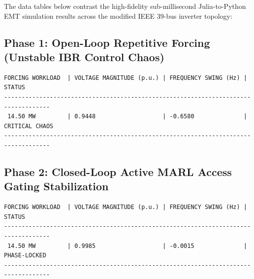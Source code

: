 \documentclass[11pt,fleqn]{article}
\begin{document}
The data tables below contrast the high-fidelity sub-millisecond Julia-to-Python EMT simulation results across the modified IEEE 39-bus inverter topology:

\subsection{Phase 1: Open-Loop Repetitive Forcing (Unstable IBR Control Chaos)}
\begin{verbatim}
FORCING WORKLOAD  | VOLTAGE MAGNITUDE (p.u.) | FREQUENCY SWING (Hz) | STATUS
-----------------------------------------------------------------------------------
 14.50 MW         | 0.9448                   | -0.6580              | CRITICAL CHAOS
-----------------------------------------------------------------------------------
\end{verbatim}

\subsection{Phase 2: Closed-Loop Active MARL Access Gating Stabilization}
\begin{verbatim}
FORCING WORKLOAD  | VOLTAGE MAGNITUDE (p.u.) | FREQUENCY SWING (Hz) | STATUS
-----------------------------------------------------------------------------------
 14.50 MW         | 0.9985                   | -0.0015              | PHASE-LOCKED
-----------------------------------------------------------------------------------
\end{verbatim}
\end{document}
